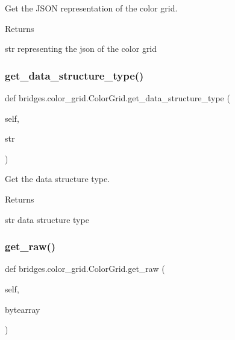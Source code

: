 Get the J\+S\+ON representation of the color grid. 

\begin{DoxyReturn}{Returns}


str representing the json of the color grid 
\end{DoxyReturn}
\mbox{\label{classbridges_1_1color__grid_1_1_color_grid_a4dbf23124fdc8edae222c100cf7b9363}} 
\subsubsection{\texorpdfstring{get\+\_\+data\+\_\+structure\+\_\+type()}{get\_data\_structure\_type()}}
{\footnotesize\ttfamily def bridges.\+color\+\_\+grid.\+Color\+Grid.\+get\+\_\+data\+\_\+structure\+\_\+type (\begin{DoxyParamCaption}\item[{}]{self,  }\item[{}]{str }\end{DoxyParamCaption})}



Get the data structure type. 

\begin{DoxyReturn}{Returns}


str data structure type 
\end{DoxyReturn}
\mbox{\label{classbridges_1_1color__grid_1_1_color_grid_ab6685633fe237eb118cf2db2f624cd60}} 
\subsubsection{\texorpdfstring{get\+\_\+raw()}{get\_raw()}}
{\footnotesize\ttfamily def bridges.\+color\+\_\+grid.\+Color\+Grid.\+get\+\_\+raw (\begin{DoxyParamCaption}\item[{}]{self,  }\item[{}]{bytearray }\end{DoxyParamCaption})}




